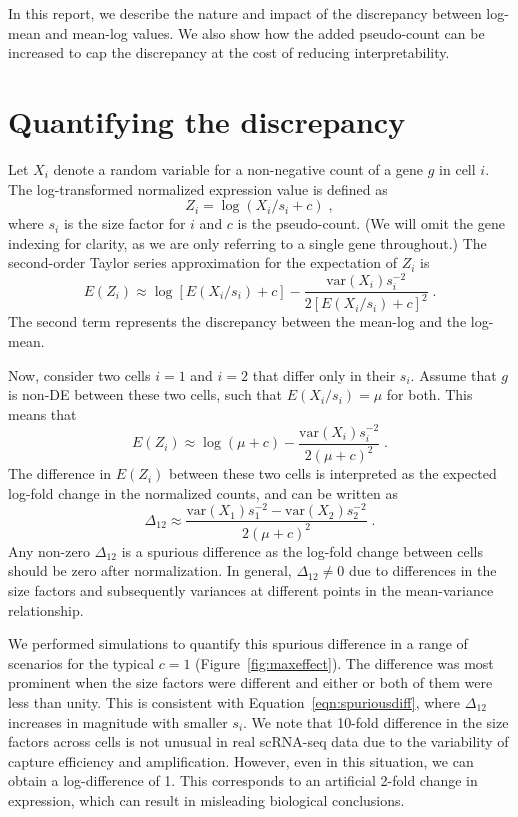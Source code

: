 \documentclass[10pt,letterpaper]{article}
\begin{document}
In this report, we describe the nature and impact of the discrepancy between log-mean and mean-log values.
We also show how the added pseudo-count can be increased to cap the discrepancy at the cost of reducing interpretability.

\section{Quantifying the discrepancy}
Let $X_i$ denote a random variable for a non-negative count of a gene $g$ in cell $i$.
The log-transformed normalized expression value is defined as 
\[
Z_i = \log(X_i / s_i + c) \;,
\]
where $s_i$ is the size factor for $i$ and $c$ is the pseudo-count.
(We will omit the gene indexing for clarity, as we are only referring to a single gene throughout.)
The second-order Taylor series approximation for the expectation of $Z_i$ is
\[
E(Z_i) \approx \log[E(X_i/s_i) + c] - \frac{\mbox{var}(X_i)s_i^{-2}}{2[E(X_i/s_i) + c]^2} \;.
\]
The second term represents the discrepancy between the mean-log and the log-mean.

Now, consider two cells $i=1$ and $i=2$ that differ only in their $s_i$.
Assume that $g$ is non-DE between these two cells, such that $E(X_i/s_i)=\mu$ for both.
This means that
\[
E(Z_i) \approx \log(\mu + c) - \frac{\mbox{var}(X_i)s_i^{-2}}{2(\mu + c)^2} \;.
\]
The difference in $E(Z_i)$ between these two cells is interpreted as the expected log-fold change in the normalized counts, and can be written as
\begin{equation}
\Delta_{12} \approx \frac{\mbox{var}(X_1)s_1^{-2} -  \mbox{var}(X_2)s_2^{-2}}{2(\mu + c)^2} \;. \label{eqn:spuriousdiff}
\end{equation}
Any non-zero $\Delta_{12}$ is a spurious difference as the log-fold change between cells should be zero after normalization.
In general, $\Delta_{12}\neq 0$ due to differences in the size factors and subsequently variances at different points in the mean-variance relationship.

We performed simulations to quantify this spurious difference in a range of scenarios for the typical $c=1$ (Figure~\ref{fig:maxeffect}).
The difference was most prominent when the size factors were different and either or both of them were less than unity.
This is consistent with Equation~\ref{eqn:spuriousdiff}, where $\Delta_{12}$ increases in magnitude with smaller $s_i$.
We note that 10-fold difference in the size factors across cells is not unusual in real scRNA-seq data \cite{lun2016pooling} due to the variability of capture efficiency and amplification.
However, even in this situation, we can obtain a log-difference of 1.
This corresponds to an artificial 2-fold change in expression, which can result in misleading biological conclusions.
\end{document}
